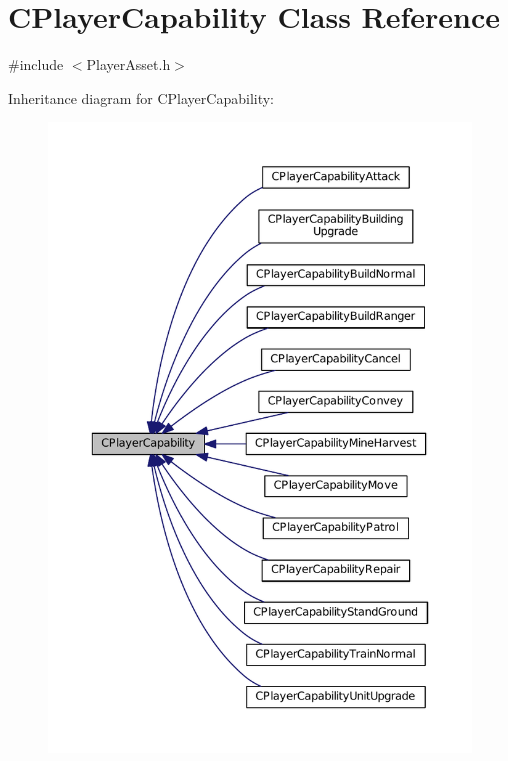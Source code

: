\hypertarget{classCPlayerCapability}{}\section{C\+Player\+Capability Class Reference}
\label{classCPlayerCapability}


{\ttfamily \#include $<$Player\+Asset.\+h$>$}



Inheritance diagram for C\+Player\+Capability\+:
\nopagebreak
\begin{figure}[H]
\begin{center}
\leavevmode
\includegraphics[width=350pt]{classCPlayerCapability__inherit__graph}
\end{center}
\end{figure}

